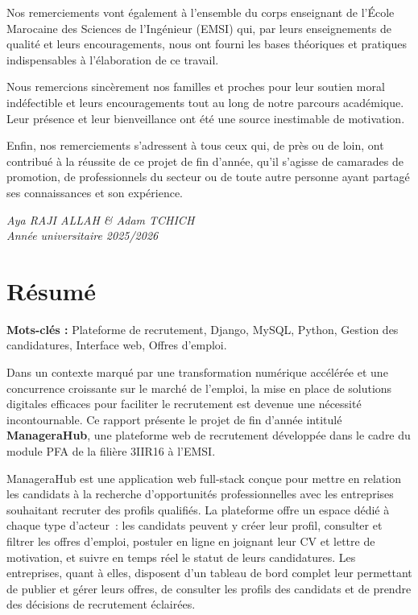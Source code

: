 \documentclass[12pt,a4paper]{report}
\begin{document}
Nos remerciements vont également à l'ensemble du corps enseignant de l'École Marocaine des Sciences de l'Ingénieur (EMSI) qui, par leurs enseignements de qualité et leurs encouragements, nous ont fourni les bases théoriques et pratiques indispensables à l'élaboration de ce travail.

Nous remercions sincèrement nos familles et proches pour leur soutien moral indéfectible et leurs encouragements tout au long de notre parcours académique. Leur présence et leur bienveillance ont été une source inestimable de motivation.

Enfin, nos remerciements s'adressent à tous ceux qui, de près ou de loin, ont contribué à la réussite de ce projet de fin d'année, qu'il s'agisse de camarades de promotion, de professionnels du secteur ou de toute autre personne ayant partagé ses connaissances et son expérience.

\vspace{1cm}
\begin{flushright}
\textit{Aya RAJI ALLAH \& Adam TCHICH}\\
\textit{Année universitaire 2025/2026}
\end{flushright}

\chapter*{Résumé}
\thispagestyle{plain}

\begin{infobox}
\textbf{Mots-clés :} Plateforme de recrutement, Django, MySQL, Python, Gestion des candidatures, Interface web, Offres d'emploi.
\end{infobox}

\vspace{0.5cm}

Dans un contexte marqué par une transformation numérique accélérée et une concurrence croissante sur le marché de l'emploi, la mise en place de solutions digitales efficaces pour faciliter le recrutement est devenue une nécessité incontournable. Ce rapport présente le projet de fin d'année intitulé \textbf{ManageraHub}, une plateforme web de recrutement développée dans le cadre du module PFA de la filière 3IIR16 à l'EMSI.

ManageraHub est une application web full-stack conçue pour mettre en relation les candidats à la recherche d'opportunités professionnelles avec les entreprises souhaitant recruter des profils qualifiés. La plateforme offre un espace dédié à chaque type d'acteur~: les candidats peuvent y créer leur profil, consulter et filtrer les offres d'emploi, postuler en ligne en joignant leur CV et lettre de motivation, et suivre en temps réel le statut de leurs candidatures. Les entreprises, quant à elles, disposent d'un tableau de bord complet leur permettant de publier et gérer leurs offres, de consulter les profils des candidats et de prendre des décisions de recrutement éclairées.
\end{document}
